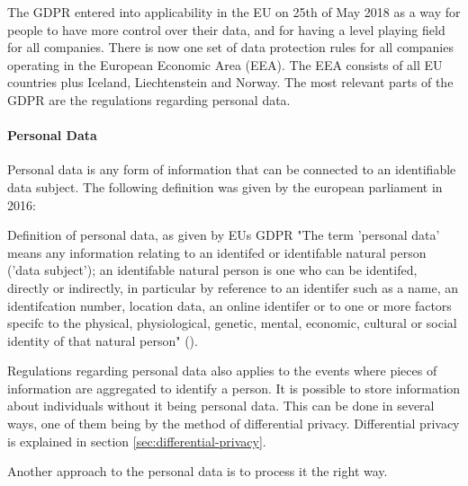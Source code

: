 The GDPR entered into applicability in the EU on 25th of May 2018 as a way for people to have more control over their data, and for having a level playing field for all companies. There is now one set of data protection rules for all companies operating in the European Economic Area (EEA). The EEA consists of all EU countries plus Iceland, Liechtenstein and Norway. The most relevant parts of the GDPR are the regulations regarding personal data.

\paragraph{Personal Data}
\label{sec:personal_data}
Personal data is any form of information that can be connected to an identifiable data subject. The following definition was given by the european parliament in 2016:

\begin{myquote}{Definition of personal data, as given by EUs GDPR}
    "The term 'personal data' means any information relating to an identifed or identifable natural person ('data subject'); an identifable natural person is one who can be identifed, directly or indirectly, in particular by reference to an identifer such as a name, an identifcation number, location data, an online identifer or to one or more factors specifc to the physical, physiological, genetic, mental, economic, cultural or social identity of that natural person" (\cite{in2023gdpr_website}).
\end{myquote}

Regulations regarding personal data also applies to the events where pieces of information are aggregated to identify a person. It is possible to store information about individuals without it being personal data. This can be done in several ways, one of them being by the method of differential privacy. Differential privacy is explained in section \ref{sec:differential-privacy}.

Another approach to the personal data is to process it the right way.

